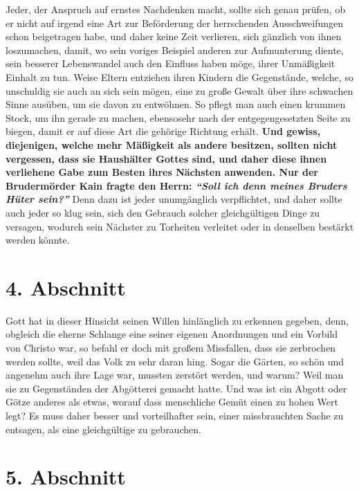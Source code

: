 Jeder, der Anspruch auf ernstes Nachdenken macht, sollte sich genau prüfen, ob
er nicht auf irgend eine Art zur Beförderung der herrschenden Ausschweifungen
schon beigetragen habe, und daher keine Zeit verlieren, sich gänzlich von ihnen
loszumachen, damit, wo sein voriges Beispiel anderen zur Aufmunterung
diente, sein besserer Lebenswandel auch den Einfluss haben möge, ihrer
Unmäßigkeit Einhalt zu tun. Weise
Eltern
entziehen ihren Kindern die
Gegenstände, welche, so unschuldig sie auch an sich sein mögen, eine zu große
Gewalt über ihre schwachen Sinne ausüben, um sie davon zu entwöhnen. So pflegt
man auch einen krummen Stock, um ihn gerade zu machen, ebensosehr nach der
entgegengesetzten Seite zu biegen, damit er auf diese Art die gehörige Richtung
erhält.  \label{ref:18_03_vorbild}\textbf{Und gewiss,
diejenigen, welche mehr
Mäßigkeit als andere besitzen,
sollten nicht vergessen, dass sie Haushälter Gottes sind, und daher diese ihnen
verliehene Gabe zum Besten ihres Nächsten anwenden. Nur der Brudermörder
Kain
fragte den Herrn:
\textit{"`Soll ich denn meines Bruders Hüter sein?"'}}
Denn dazu ist jeder unumgänglich verpflichtet, und daher sollte auch jeder
so klug sein, sich den Gebrauch solcher gleichgültigen Dinge zu versagen,
wodurch sein Nächster zu Torheiten verleitet oder in denselben bestärkt werden
könnte.

\section{4. Abschnitt} \label{kap18_ab4}

Gott hat in dieser Hinsicht seinen Willen hinlänglich zu erkennen gegeben, denn,
obgleich die eherne Schlange eine seiner eigenen Anordnungen und
ein Vorbild von
Christo war, so befahl er doch mit großem Missfallen, dass sie zerbrochen werden
sollte, weil das Volk zu sehr daran hing. Sogar die Gärten, so schön und
angenehm
auch ihre Lage war, mussten zerstört werden, und warum? Weil man sie zu
Gegenständen der Abgötterei gemacht hatte. Und was ist
ein
Abgott oder Götze
anderes als etwas, worauf dass menschliche Gemüt einen zu hohen Wert legt? Es
muss daher besser und vorteilhafter sein, einer missbrauchten Sache zu
entsagen, als eine gleichgültige zu gebrauchen.

\section{5. Abschnitt} \label{kap18_ab5}

